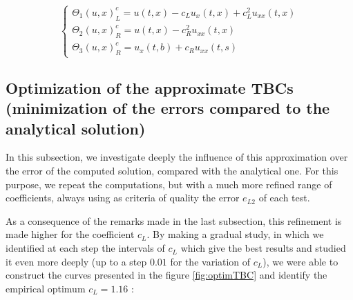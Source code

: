 \begin{equation*}
    \begin{cases}
        \Theta_1(u,x)^c_L = u(t,x) - c_L u_x(t,x)  + c_L^2  u_{xx}(t,x) \\
        \Theta_2(u,x)^c_R =  u(t,x) - c_R^2    u_{xx}(t,x)\\
        \Theta_3(u,x)^c_R = u_x(t,b) + c_R u_{xx}(t,s) 
    \end{cases}
\end{equation*}

\subsection{Optimization of the approximate TBCs (minimization of the errors compared to the analytical solution)}

\indent In this subsection, we investigate deeply the influence of this approximation over the error of the computed solution, compared with the analytical one. For this purpose, we repeat the computations, but with a much more refined range of coefficients, always using as criteria of quality the error $e_{L2}$ of each test.

\indent As a consequence of the remarks made in the last subsection, this refinement is made higher for the coefficient $c_L$. By making a gradual study, in which we identified at each step the intervals of $c_L$ which give the best results and studied it even more deeply (up to a step $0.01$ for the variation of $c_L$), we were able to construct the curves presented in the figure \ref{fig:optimTBC} and identify the empirical optimum $c_L = 1.16$ :

